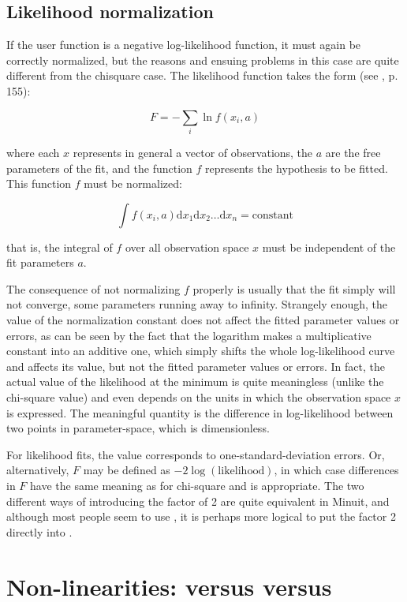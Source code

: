 \subsection{Likelihood normalization}

If the user function is a negative log-likelihood function, it must 
again be correctly normalized, but the reasons and ensuing problems 
in this case are quite different from the chisquare case. The 
likelihood function takes the form (see \cite{bib-EADIE}, p. 155):
 
\[ F = - \sum_{i} \ln f(x_i,a) \]
 
where each $x$ represents in general a vector of observations, the $a$ 
are the free parameters of the fit, and the function $f$ represents the 
hypothesis to be fitted. This function $f$ must be normalized:
 
\[ \int f(x_i,a) \mathrm{d}x_1 \mathrm{d}x_2 \ldots 
                 \mathrm{d}x_n = \mathrm{constant} \]
 
that is, the integral of $f$ over all observation space $x$ must be 
independent of the fit parameters $a$.
 
The consequence of not normalizing $f$ properly is usually that the fit 
simply will not converge, some parameters running away to infinity. 
Strangely enough, the value of the normalization constant does not 
affect the fitted parameter values or errors, as can be seen by the 
fact that the logarithm makes a multiplicative constant into an 
additive one, which simply shifts the whole log-likelihood curve and 
affects its value, but not the fitted parameter values or errors. In 
fact, the actual value of the likelihood at the minimum is quite 
meaningless (unlike the chi-square value) and even depends on the 
units in which the observation space $x$ is expressed. The meaningful 
quantity is the difference in log-likelihood between two points in 
parameter-space, which is dimensionless.
 
For likelihood fits, the value  corresponds to 
one-standard-deviation errors. 
Or, alternatively, $F$ may be defined as $-2\log(\mathrm{likelihood})$, 
in which case differences in $F$ have the same meaning as for chi-square 
and  is appropriate. The two different ways of introducing the 
factor of 2 are quite equivalent in Minuit, and although most people 
seem to use , it is perhaps more logical to put the 
factor 2 directly into .
 
\section{Non-linearities: \protect{} versus 
\protect{} versus \protect{}}
\label{sec:errornonlin}

